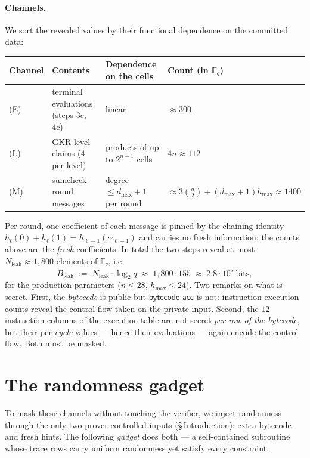 \documentclass{article}
\newcommand{\Fq}{\mathbb{F}_q}
\theoremstyle{definition}
\begin{document}
\paragraph{Channels.} We sort the revealed values by their functional dependence on the committed data:
\begin{center}
\begin{tabular}{llll}
\toprule
Channel & Contents & Dependence on the cells & Count (in $\Fq$)\\
\midrule
(E) & terminal evaluations (steps 3c, 4c) & linear & $\approx 300$\\
(L) & GKR level claims ($4$ per level) & products of up to $2^{n-1}$ cells & $4n \approx 112$ \\
(M) & sumcheck round messages & degree $\leq d_{\max} + 1$ per round & $\approx 3\binom{n}{2} + (d_{\max}{+}1) h_{\max} \approx 1400$ \\
\bottomrule
\end{tabular}
\end{center}
Per round, one coefficient of each message is pinned by the chaining identity $h_\ell(0) + h_\ell(1) = h_{\ell-1}(\alpha_{\ell-1})$ and carries no fresh information; the counts above are the \emph{fresh} coefficients. In total the two steps reveal at most $N_{\mathrm{leak}} \approx 1{,}800$ elements of $\Fq$, i.e.
\[
B_{\mathrm{leak}} \;:=\; N_{\mathrm{leak}} \cdot \log_2 q \;\approx\; 1{,}800 \cdot 155 \;\approx\; 2.8 \cdot 10^5 \ \text{bits} ,
\]
for the production parameters ($n \leq 28$, $h_{\max} \leq 24$). Two remarks on what is secret. First, the \emph{bytecode} is public but $\textsf{bytecode\_acc}$ is not: instruction execution counts reveal the control flow taken on the private input. Second, the $12$ instruction columns of the execution table are not secret \emph{per row of the bytecode}, but their per-\emph{cycle} values --- hence their evaluations --- again encode the control flow. Both must be masked.

\section{The randomness gadget}\label{sec:gadget}

To mask these channels without touching the verifier, we inject randomness through the only two prover-controlled inputs (\S\,Introduction): extra bytecode and fresh hints. The following \emph{gadget} does both --- a self-contained subroutine whose trace rows carry uniform randomness yet satisfy every constraint.
\end{document}
